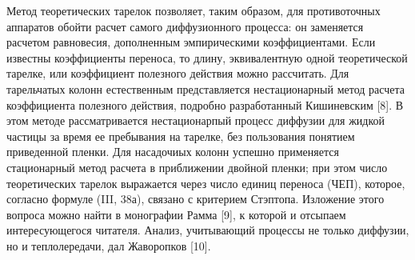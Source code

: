Метод теоретических тарелок позволяет, таким образом, для противоточных аппаратов обойти расчет самого диффузионного процесса: он заменяется расчетом равновесия, дополненным эмпирическими коэффициентами. Если известны коэффициенты переноса, то длину, эквивалентную одной теоретической тарелке, или коэффициент полезного действия можно рассчитать. Для тарельчатых колонн естественным представляется нестационарный метод расчета коэффициента полезного действия, подробно разработанный Кишиневским [8]. В этом методе рассматривается нестационарпый процесс диффузии для жидкой частицы за время ее пребывания на тарелке, без пользования понятием приведенной пленки. Для насадочиых колонн успешно применяется стационарный метод расчета в приближении двойной пленки; при этом число теоретических тарелок выражается через число единиц переноса (ЧЕП), которое, согласно формуле (III, 38а), связано с критерием Стэптопа. Изложение этого вопроса можно найти в монографии Рамма [9], к которой и отсыпаем интересующегося читателя. Анализ, учитывающий процессы не только диффузии, но и теплолередачи, дал Жаворопков [10]. 


